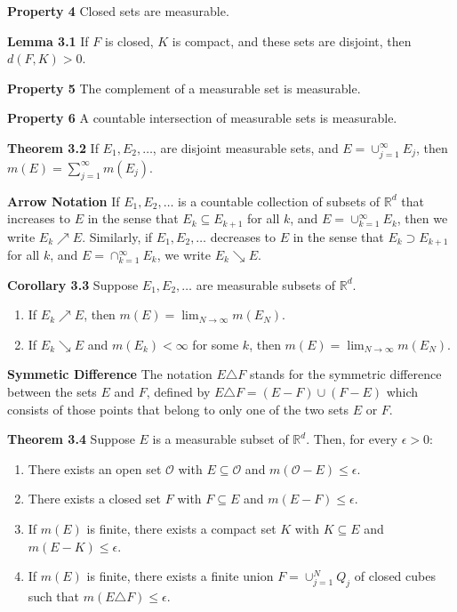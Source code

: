 \documentclass[6pt,landscape]{article}
\begin{document}
\begin{multicols*}{3}
\textbf{Property 4} Closed sets are measurable.

\textbf{Lemma 3.1} If $F$ is closed, $K$ is compact, and these sets are disjoint, then $d(F,K)>0$. 

\textbf{Property 5} The complement of a measurable set is measurable.

\textbf{Property 6} A countable intersection of measurable sets is measurable.

\textbf{Theorem 3.2} If $E_1,E_2,\hdots$, are disjoint measurable sets, and $E = \cup_{j=1}^{\infty} E_j$, then $m(E) = \sum_{j=1}^{\infty} m(E_j)$.

\textbf{Arrow Notation} If $E_1,E_2,\hdots$ is a countable collection of subsets of $\mathbb{R}^d$ that increases to $E$ in the sense that $E_k\subseteq E_{k+1}$ for all $k$, and
$E = \cup_{k=1}^{\infty} E_k$, then we write $E_k\nearrow E$. Similarly, if $E_1,E_2,\hdots$ decreases to $E$ in the sense that $E_k \supset E_{k+1}$ for all $k$, and
$E = \cap_{k=1}^{\infty} E_k$, we write $E_k \searrow E$.

\textbf{Corollary 3.3} Suppose $E_1,E_2,\hdots$ are measurable subsets of $\mathbb{R}^d$.
\begin{enumerate}
	\item If $E_k\nearrow E$, then $m(E) = \lim_{N\to\infty} m(E_N)$.
	\item If $E_k\searrow E$ and $m(E_k)<\infty$ for some $k$, then $m(E) = \lim_{N\to\infty} m(E_N)$.
\end{enumerate}

\textbf{Symmetic Difference} The notation $E\triangle F$ stands for the symmetric difference between the sets $E$ and $F$, defined by $E\triangle F = (E-F)\cup (F-E)$ which consists
of those points that belong to only one of the two sets $E$ or $F$.

\textbf{Theorem 3.4} Suppose $E$ is a measurable subset of $\mathbb{R}^d$. Then, for every $\epsilon>0$:
\begin{enumerate}
	\item There exists an open set $\mathcal{O}$ with $E\subseteq \mathcal{O}$ and $m(\mathcal{O}-E)\leq \epsilon$.
	\item There exists a closed set $F$ with $F\subseteq E$ and $m(E-F)\leq \epsilon$.
	\item If $m(E)$ is finite, there exists a compact set $K$ with $K\subseteq E$ and $m(E-K)\leq \epsilon$.
	\item If $m(E)$ is finite, there exists a finite union $F = \cup_{j=1}^N Q_j$ of closed cubes such that $m(E\triangle F)\leq \epsilon$.
\end{enumerate}


\end{multicols*}
\end{document}
